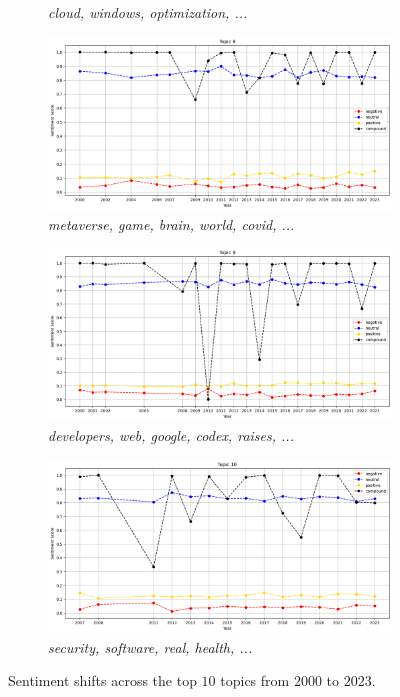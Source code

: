 \begin{figure}[H]
\begin{subfigure}[b]{0.45\textwidth}
    \caption{\emph{cloud, windows, optimization, ...}}
    \label{fig:sentiments-topic-7}
  \end{subfigure}
  \hfill
  \begin{subfigure}[b]{0.45\textwidth}
    \includegraphics[width=\textwidth]{figures/sentiments/topic-8.png}
    \caption{\emph{metaverse, game, brain, world, covid, ...}}
    \label{fig:sentiments-topic-8}
  \end{subfigure}

  \begin{subfigure}[b]{0.45\textwidth}
    \includegraphics[width=\textwidth]{figures/sentiments/topic-9.png}
    \caption{\emph{developers, web, google, codex, raises, ...}}
    \label{fig:sentiments-topic-9}
  \end{subfigure}
  \hfill
  \begin{subfigure}[b]{0.45\textwidth}
    \includegraphics[width=\textwidth]{figures/sentiments/topic-10.png}
    \caption{\emph{security, software, real, health, ...}}
    \label{fig:sentiments-topic-10}
  \end{subfigure}
  \caption{Sentiment shifts across the top $10$ topics from $2000$ to $2023$.}
  \label{fig:sentiments-topics}
\end{figure}

